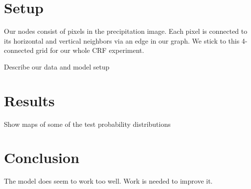 \section{Setup}

Our nodes consist of pixels in the precipitation image. Each pixel is connected to its horizontal and vertical neighbors via an edge in our graph. We stick to this 4-connected grid for our whole CRF experiment. 

Describe our data and model setup

\section{Results}

Show maps of some of the test probability distributions

\section{Conclusion}

The model does seem to work too well. Work is needed to improve it. 


